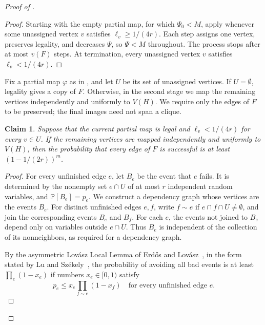 \documentclass[10pt]{article}
\numberwithin{equation}{section}
\newtheorem{claim}[claim]{Claim}
\newcommand{\Prb}{\mathbb P}
\begin{document}
\begin{proof}[Proof of ]
\begin{proof}
Starting with the empty partial map, for which $\Psi_0<M$, apply  whenever some unassigned vertex $v$ satisfies $\ell_v\ge1/(4r)$. Each step assigns one vertex, preserves legality, and decreases $\Psi$, so $\Psi<M$ throughout. The process stops after at most $v(F)$ steps. At termination, every unassigned vertex $v$ satisfies $\ell_v<1/(4r)$.
\end{proof}

Fix a partial map $\varphi$ as in , and let $U$ be its set of unassigned vertices. If $U=\emptyset$, legality gives a copy of $F$. Otherwise, in the second stage we map the remaining vertices independently and uniformly to $V(H)$. We require only the edges of $F$ to be preserved; the final images need not span a clique.

\begin{claim}\label{lem:local-completion}
Suppose that the current partial map is legal and $\ell_v<1/(4r)$ for every $v\in U$. If the remaining vertices are mapped independently and uniformly to $V(H)$, then the probability that every edge of $F$ is successful is at least $(1-1/(2r))^m$.
\end{claim}

\begin{proof}
For every unfinished edge $e$, let $B_e$ be the event that $e$ fails. It is determined by the nonempty set $e\cap U$ of at most $r$ independent random variables, and $\Prb[B_e]=p_e$. We construct a dependency graph whose vertices are the events $B_e$. For distinct unfinished edges $e,f$, write $f\sim e$ if $e\cap f\cap U\ne\emptyset$, and join the corresponding events $B_e$ and $B_f$. For each $e$, the events not joined to $B_e$ depend only on variables outside $e\cap U$. Thus $B_e$ is independent of the collection of its nonneighbors, as required for a dependency graph.

By the asymmetric Lov\'asz Local Lemma of Erd\H{o}s and Lov\'asz~\cite{ErdosLovasz75}, in the form stated by Lu and Sz\'ekely~\cite[Lemma~2]{LuSzekely07}, the probability of avoiding all bad events is at least $\prod_e(1-x_e)$ if numbers $x_e\in[0,1)$ satisfy
\[
p_e\le x_e\prod_{f\sim e}(1-x_f)
\quad\text{for every unfinished edge }e.
\]


\end{proof}
\end{proof}
\end{document}
